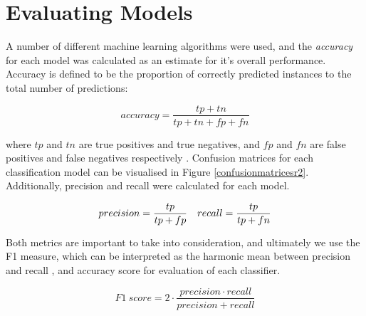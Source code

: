 \section{Evaluating Models} \label{evalmodels}

A number of different machine learning algorithms were used, and the \textit{accuracy} for each model was calculated as an estimate for it's overall performance. Accuracy is defined to be the proportion of correctly predicted instances to the total number of predictions:

\begin{equation}
    accuracy = \frac{tp+tn}{tp+tn+fp+fn}
\end{equation}

where $tp$ and $tn$ are true positives and true negatives, and $fp$ and $fn$ are false positives and false negatives respectively \cite{vanwinckelen2012estimating}. Confusion matrices for each classification model can be visualised in Figure \ref{confusionmatricesr2}.
Additionally, precision and recall were calculated for each model.

\begin{equation}
    precision = \frac{tp}{tp+fp} \\
\quad recall = \frac{tp}{tp+fn}
\end{equation}

Both metrics are important to take into consideration, and ultimately we use the F1 measure, which can be interpreted as the harmonic mean between precision and recall \cite{buckland1994relationship}, and accuracy score for evaluation of each classifier.

\begin{equation}
    F1 \ score = 2 \cdot \frac{precision \cdot recall}{precision + recall}
\end{equation}


